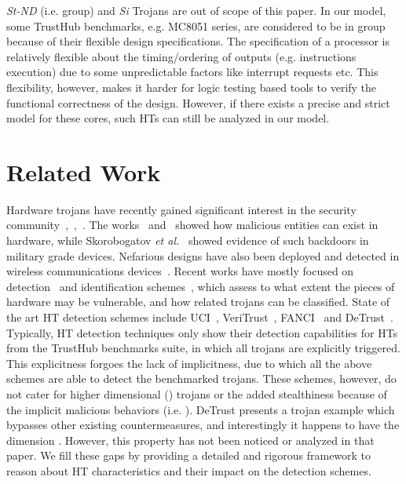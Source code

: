 \documentclass[10pt,journal,compsoc]{IEEEtran}
\begin{document}
\textit{St-ND}  (i.e.  group) and \textit{Si} Trojans are out of scope of this paper.
In our model, some TrustHub benchmarks, e.g. MC8051 series, are considered to be in  group because of their flexible design specifications.
The specification of a processor is relatively flexible about the timing/ordering of outputs (e.g. instructions execution) due to some unpredictable factors like interrupt requests etc. 
This flexibility, however, makes it harder for logic testing based tools to verify the functional correctness of the design. 
However, if there exists a precise and strict model for these cores, such HTs can still be analyzed in our model.





 \vspace{6pt}
\section{Related Work}\label{sec:related_work}

Hardware trojans have recently gained significant interest in the security community~\cite{taxonomy},~\cite{usenix08},~\cite{huntforkill}. 
The works~\cite{usenix08} and~\cite{huntforkill} showed how malicious entities can exist in hardware, while Skorobogatov \emph{et al.}~\cite{military} showed evidence of such backdoors in military grade devices.
Nefarious designs have also been deployed and detected in wireless communications devices~\cite{wireless}.
Recent works have mostly focused on detection~\cite{iccd_12} and identification schemes~\cite{iccad_12}, which assess to what extent the pieces of hardware may be vulnerable, and how related trojans can be classified.
State of the art HT detection schemes include UCI~\cite{sp2010}, VeriTrust~\cite{veritrust}, FANCI~\cite{fanci} and DeTrust~\cite{detrust}.
Typically, HT detection techniques only show their detection capabilities for HTs from the TrustHub benchmarks suite, in which all trojans are explicitly triggered.
This explicitness forgoes the lack of implicitness, due to which all the above schemes are able to detect the benchmarked trojans.
These schemes, however, do not cater for higher dimensional () trojans or the added stealthiness because of the implicit malicious behaviors (i.e. ).
DeTrust presents a trojan example which bypasses other existing countermeasures, and interestingly it happens to have the dimension .
However, this property has not been noticed or analyzed in that paper.
We fill these gaps by providing a detailed and rigorous framework to reason about HT characteristics and their impact on the detection schemes.
\end{document}
